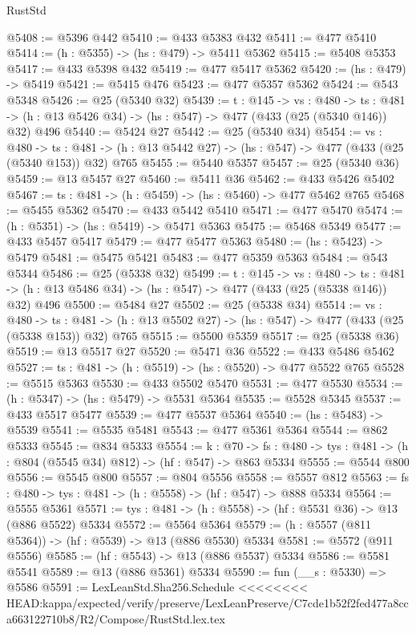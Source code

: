 \begin{lexlean}{RustStd}
\begin{coremodule}
{\begin{coremodule}
{{{{{{{{{{{{{{{{@5408 := @5396 @442
@5410 := @433 @5383 @432
@5411 := @477 @5410
@5414 := (h : @5355) -> (hs : @479) -> @5411 @5362
@5415 := @5408 @5353
@5417 := @433 @5398 @432
@5419 := @477 @5417 @5362
@5420 := (hs : @479) -> @5419
@5421 := @5415 @476
@5423 := @477 @5357 @5362
@5424 := @543 @5348
@5426 := @25 (@5340 @32)
@5439 := {t : @145} ->
  {vs : @480} ->
  {ts : @481} -> (h : @13 @5426 @34) -> (hs : @547) -> @477 (@433 (@25 (@5340 @146)) @32) @496
@5440 := @5424 @27
@5442 := @25 (@5340 @34)
@5454 := {vs : @480} ->
  {ts : @481} -> (h : @13 @5442 @27) -> (hs : @547) -> @477 (@433 (@25 (@5340 @153)) @32) @765
@5455 := @5440 @5357
@5457 := @25 (@5340 @36)
@5459 := @13 @5457 @27
@5460 := @5411 @36
@5462 := @433 @5426 @5402
@5467 := {ts : @481} -> (h : @5459) -> (hs : @5460) -> @477 @5462 @765
@5468 := @5455 @5362
@5470 := @433 @5442 @5410
@5471 := @477 @5470
@5474 := (h : @5351) -> (hs : @5419) -> @5471 @5363
@5475 := @5468 @5349
@5477 := @433 @5457 @5417
@5479 := @477 @5477 @5363
@5480 := (hs : @5423) -> @5479
@5481 := @5475 @5421
@5483 := @477 @5359 @5363
@5484 := @543 @5344
@5486 := @25 (@5338 @32)
@5499 := {t : @145} ->
  {vs : @480} ->
  {ts : @481} -> (h : @13 @5486 @34) -> (hs : @547) -> @477 (@433 (@25 (@5338 @146)) @32) @496
@5500 := @5484 @27
@5502 := @25 (@5338 @34)
@5514 := {vs : @480} ->
  {ts : @481} -> (h : @13 @5502 @27) -> (hs : @547) -> @477 (@433 (@25 (@5338 @153)) @32) @765
@5515 := @5500 @5359
@5517 := @25 (@5338 @36)
@5519 := @13 @5517 @27
@5520 := @5471 @36
@5522 := @433 @5486 @5462
@5527 := {ts : @481} -> (h : @5519) -> (hs : @5520) -> @477 @5522 @765
@5528 := @5515 @5363
@5530 := @433 @5502 @5470
@5531 := @477 @5530
@5534 := (h : @5347) -> (hs : @5479) -> @5531 @5364
@5535 := @5528 @5345
@5537 := @433 @5517 @5477
@5539 := @477 @5537 @5364
@5540 := (hs : @5483) -> @5539
@5541 := @5535 @5481
@5543 := @477 @5361 @5364
@5544 := @862 @5333
@5545 := @834 @5333
@5554 := {k : @70} ->
  {fs : @480} -> {tys : @481} -> (h : @804 (@5545 @34) @812) -> (hf : @547) -> @863 @5334
@5555 := @5544 @800
@5556 := @5545 @800
@5557 := @804 @5556
@5558 := @5557 @812
@5563 := {fs : @480} -> {tys : @481} -> (h : @5558) -> (hf : @547) -> @888 @5334
@5564 := @5555 @5361
@5571 := {tys : @481} -> (h : @5558) -> (hf : @5531 @36) -> @13 (@886 @5522) @5334
@5572 := @5564 @5364
@5579 := (h : @5557 (@811 @5364)) -> (hf : @5539) -> @13 (@886 @5530) @5334
@5581 := @5572 (@911 @5556)
@5585 := (hf : @5543) -> @13 (@886 @5537) @5334
@5586 := @5581 @5541
@5589 := @13 (@886 @5361) @5334
@5590 := fun (__s : @5330) => @5586
@5591 := LexLeanStd.Sha256.Schedule
<<<<<<<< HEAD:kappa/expected/verify/preserve/LexLeanPreserve/C7cde1b52f2fed477a8cca663122710b8/R2/Compose/RustStd.lex.tex
}}}}}}}}}}}}}}}}
\end{coremodule}}
\end{coremodule}
\end{lexlean}
